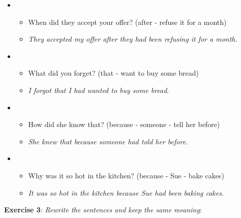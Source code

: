 \begin{itemize}
\item
\begin{itemize}
\item When did they accept your offer? (after - refuse it for a month)
\item \textit{They accepted my offer after they had been refusing it for a month}.
\end{itemize}

\item
\begin{itemize}
\item What did you forget? (that - want to buy some bread)
\item \textit{I forgot that I had wanted to buy some bread}.
\end{itemize}

\item
\begin{itemize}
\item How did she know that? (because - someone - tell her before)
\item \textit{She knew that because someone had told her before}.
\end{itemize}

\item
\begin{itemize}
\item Why was it so hot in the kitchen? (because - Sue - bake cakes)
\item \textit{It was so hot in the kitchen because Sue had been baking cakes}.
\end{itemize}

\end{itemize}

\textbf{Exercise 3}: \textit{Rewrite the sentences and keep the same meaning}:


